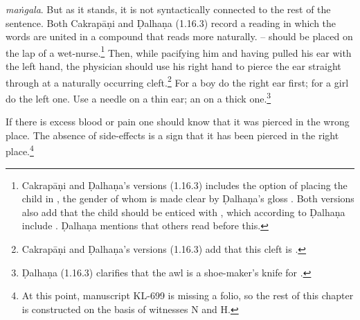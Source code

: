 \begin{translation}
{    \emph{maṅgala}.  But as it stands, it is not syntactically connected to the rest of the sentence.  Both Cakrapāṇi and Ḍalhaṇa (1.16.3) record a reading in which the words are united in a compound that reads more naturally.} -- should be placed on the lap of a wet-nurse.\footnote{Cakrapāṇi and Ḍalhaṇa's versions (1.16.3) includes the option of placing the child in ,  the gender of whom is made clear by  Ḍalhaṇa's gloss . Both versions also add that the child should be enticed with , which according to Ḍalhaṇa include . Ḍalhaṇa mentions that others read  before this.} Then, while pacifying him and having pulled his ear with the left hand, the physician should use his right hand to pierce the ear straight through at a naturally occurring cleft.\footnote{Cakrapāṇi and Ḍalhaṇa's versions (1.16.3) add that this cleft is .} For a boy do
    the right ear first; for a girl do the left one. Use a needle on a
    thin ear; an  on a thick one.\footnote{Ḍalhaṇa (1.16.3) clarifies that the awl is a shoe-maker's knife for .}
    
    \item [3]  If there is excess blood or pain one should know that it was pierced
    in the wrong place. The absence of side-effects is a sign that it has been pierced 
    in the right place.\footnote{At this point, manuscript KL-699 is missing a folio, so the rest of this chapter
    is constructed on the basis of witnesses N and H.}
    

\end{translation}
